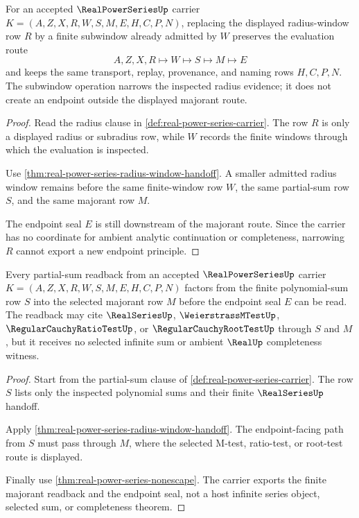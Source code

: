 \begin{theorem}\label{thm:real-power-series-radius-subwindow-monotonicity}
For an accepted $\RealPowerSeriesUp$ carrier $K=(A,Z,X,R,W,S,M,E,H,C,P,N)$, replacing the displayed radius-window row $R$ by a finite subwindow already admitted by $W$ preserves the evaluation route
$$
A,Z,X,R\longmapsto W\longmapsto S\longmapsto M\longmapsto E
$$
and keeps the same transport, replay, provenance, and naming rows $H,C,P,N$. The subwindow operation narrows the inspected radius evidence; it does not create an endpoint outside the displayed majorant route.
\end{theorem}
\begin{proof}
Read the radius clause in \autoref{def:real-power-series-carrier}. The row $R$ is only a displayed radius or subradius row, while $W$ records the finite windows through which the evaluation is inspected.

Use \autoref{thm:real-power-series-radius-window-handoff}. A smaller admitted radius window remains before the same finite-window row $W$, the same partial-sum row $S$, and the same majorant row $M$.

The endpoint seal $E$ is still downstream of the majorant route. Since the carrier has no coordinate for ambient analytic continuation or completeness, narrowing $R$ cannot export a new endpoint principle.
\end{proof}

\begin{theorem}\label{thm:real-power-series-partial-sum-majorant-readback}
Every partial-sum readback from an accepted $\RealPowerSeriesUp$ carrier $K=(A,Z,X,R,W,S,M,E,H,C,P,N)$ factors from the finite polynomial-sum row $S$ into the selected majorant row $M$ before the endpoint seal $E$ can be read. The readback may cite $\RealSeriesUp$, $\WeierstrassMTestUp$, $\RegularCauchyRatioTestUp$, or $\RegularCauchyRootTestUp$ through $S$ and $M$, but it receives no selected infinite sum or ambient $\RealUp$ completeness witness.
\end{theorem}
\begin{proof}
Start from the partial-sum clause of \autoref{def:real-power-series-carrier}. The row $S$ lists only the inspected polynomial sums and their finite $\RealSeriesUp$ handoff.

Apply \autoref{thm:real-power-series-radius-window-handoff}. The endpoint-facing path from $S$ must pass through $M$, where the selected M-test, ratio-test, or root-test route is displayed.

Finally use \autoref{thm:real-power-series-nonescape}. The carrier exports the finite majorant readback and the endpoint seal, not a host infinite series object, selected sum, or completeness theorem.
\end{proof}

